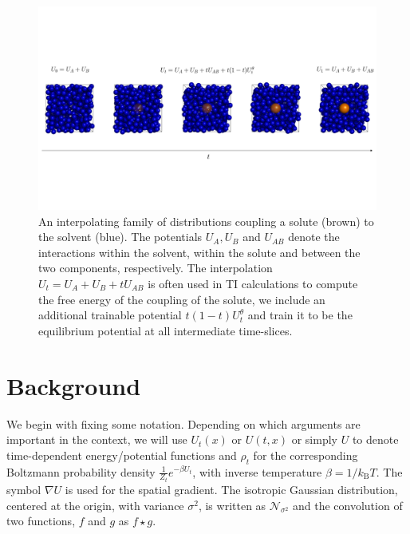 \documentclass[%
onecolumn,
superscriptaddress,
nofootinbib,
amsmath,amssymb,
table
]{revtex4-2}
\begin{document}
\begin{figure}[!htb]
\begin{center}
\centerline{\includegraphics[width=\textwidth,trim={0cm 4cm 0cm 5cm},clip]{figures/summary.pdf}}
\vspace*{-3mm}
\caption{An interpolating family of distributions coupling a solute (brown) to the solvent (blue). The potentials $U_A,U_B$ and $U_{AB}$ denote the interactions within the solvent, within the solute and between the two components, respectively. The interpolation $U_t = U_A+U_B+tU_{AB}$ is often used in TI calculations to compute the free energy of the coupling of the solute, we include an additional trainable potential $t(1-t)U_t^\theta$ and train it to be the equilibrium potential at all intermediate time-slices.}
    \label{fig:summary}
\end{center}
\vskip -0.2in
\end{figure}


\section{Background}
\label{sec:background}
We begin with fixing some notation. Depending on which arguments are important in the context, we will use $U_t(x)$ or $U(t,x)$ or simply $U$ to denote time-dependent energy/potential functions and $\rho_t$ for the corresponding Boltzmann probability density $\frac{1}{Z_t}e^{-\beta U_t}$, with inverse temperature $\beta = 1/k_\mathrm{B}T$. The symbol $\nabla U$ is used for the spatial gradient. The isotropic Gaussian distribution, centered at the origin, with variance $\sigma^2$, is written as $\mathcal N_{\sigma^2}$ and the convolution of two functions, $f$ and $g$ as $f\star g$.
\end{document}
